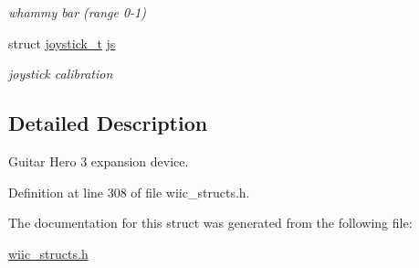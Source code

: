 \begin{DoxyCompactItemize}
\begin{DoxyCompactList}\small\item\em whammy bar (range 0-\/1) \end{DoxyCompactList}\item 
\hypertarget{structguitar__hero__3__t_ad35940d97c2fedc7776efb225742f651}{struct \hyperlink{structjoystick__t}{joystick\-\_\-t} \hyperlink{structguitar__hero__3__t_ad35940d97c2fedc7776efb225742f651}{js}}\label{structguitar__hero__3__t_ad35940d97c2fedc7776efb225742f651}

\begin{DoxyCompactList}\small\item\em joystick calibration \end{DoxyCompactList}\end{DoxyCompactItemize}


\subsection{Detailed Description}
Guitar Hero 3 expansion device. 

Definition at line 308 of file wiic\-\_\-structs.\-h.



The documentation for this struct was generated from the following file\-:\begin{DoxyCompactItemize}
\item 
\hyperlink{wiic__structs_8h}{wiic\-\_\-structs.\-h}\end{DoxyCompactItemize}
